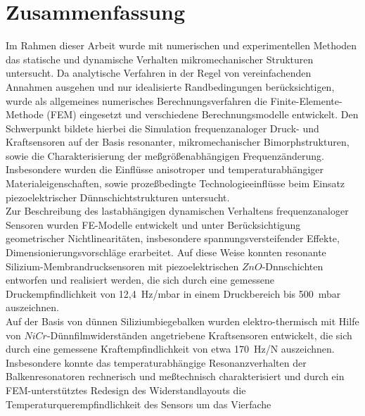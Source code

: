 \chapter*{Zusammenfassung}

%
Im Rahmen dieser Arbeit wurde mit numerischen und experimentellen Methoden
das statische und dynamische Verhalten mikromechanischer Strukturen
untersucht.
Da analytische Verfahren in der Regel von vereinfachenden Annahmen ausgehen
und nur idealisierte Randbedingungen berücksichtigen, wurde als
allgemeines numerisches Berechnungsverfahren die Finite-Elemente-Methode
(FEM) eingesetzt und verschiedene Berechnungsmodelle entwickelt.
Den Schwerpunkt bildete hierbei die Simulation frequenzanaloger Druck- und
Kraftsensoren auf der Basis resonanter, mikromechanischer Bimorphstrukturen,
sowie die Charakterisierung der meßgrößenabhängigen Frequenzänderung.
Insbesondere wurden die Einflüsse anisotroper und temperaturabhängiger
Materialeigenschaften, sowie prozeßbedingte Technologieeinflüsse
beim Einsatz piezoelektrischer Dünnschichtstrukturen
untersucht.\\
%
%
Zur Beschreibung des lastabhängigen dynamischen Verhaltens frequenzanaloger
Sensoren wurden FE-Modelle entwickelt und unter Berücksichtigung
geometrischer Nichtlinearitäten, insbesondere spannungsversteifender Effekte,
Dimensionierungsvorschläge erarbeitet. Auf diese Weise konnten
resonante Silizium-Membrandrucksensoren mit piezoelektrischen
$ZnO$-Dnnschichten entworfen und realisiert werden, die sich durch eine
gemessene Druckempfindlichkeit von 12,4~Hz/mbar in einem Druckbereich
bis 500~mbar auszeichnen.\\
Auf der Basis von dünnen Siliziumbiegebalken wurden elektro-thermisch
mit Hilfe von $NiCr$-Dünnfilmwiderständen angetriebene Kraftsensoren
entwickelt, die sich durch eine gemessene Kraftempfindlichkeit von etwa
170~Hz/N auszeichnen.
Insbesondere konnte das temperaturabhängige Resonanzverhalten der
Balkenresonatoren rechnerisch und meßtechnisch charakterisiert und durch
ein FEM-unterstütztes Redesign des Widerstandlayouts die
Temperaturquerempfindlichkeit des Sensors um das Vierfache
